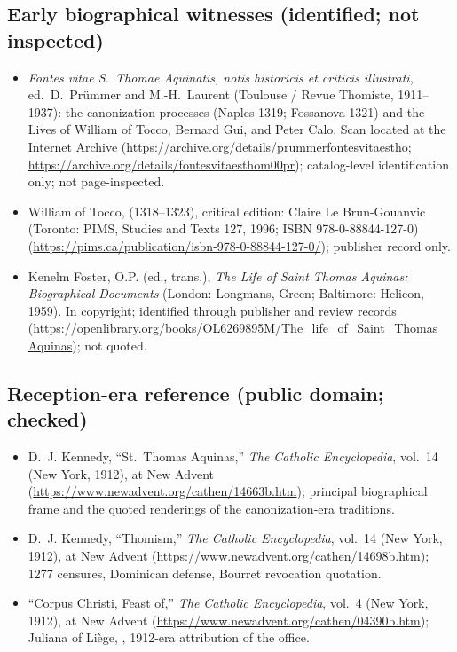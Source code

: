 \subsection*{Early biographical witnesses (identified; not inspected)}

\begin{itemize}
\item \textit{Fontes vitae S.\ Thomae Aquinatis, notis historicis et
criticis illustrati}, ed.\ D.~Pr\"ummer and M.-H.~Laurent (Toulouse /
Revue Thomiste, 1911--1937): the canonization processes (Naples 1319;
Fossanova 1321) and the Lives of William of Tocco, Bernard Gui, and
Peter Calo. Scan located at the Internet Archive
(\url{https://archive.org/details/prummerfontesvitaestho};
\url{https://archive.org/details/fontesvitaesthom00pr}); catalog-level
identification only; not page-inspected.
\item William of Tocco, 
(1318--1323), critical edition: Claire Le Brun-Gouanvic (Toronto: PIMS,
Studies and Texts 127, 1996; ISBN 978-0-88844-127-0)
(\url{https://pims.ca/publication/isbn-978-0-88844-127-0/}); publisher
record only.
\item Kenelm Foster, O.P. (ed., trans.), \textit{The Life of Saint
Thomas Aquinas: Biographical Documents} (London: Longmans, Green;
Baltimore: Helicon, 1959). In copyright; identified through publisher
and review records
(\url{https://openlibrary.org/books/OL6269895M/The_life_of_Saint_Thomas_Aquinas});
not quoted.
\end{itemize}

\subsection*{Reception-era reference (public domain; checked)}

\begin{itemize}
\item D.~J. Kennedy, ``St.\ Thomas Aquinas,'' \textit{The Catholic
Encyclopedia}, vol.~14 (New York, 1912), at New Advent
(\url{https://www.newadvent.org/cathen/14663b.htm}); principal
biographical frame and the quoted renderings of the canonization-era
traditions.
\item D.~J. Kennedy, ``Thomism,'' \textit{The Catholic Encyclopedia},
vol.~14 (New York, 1912), at New Advent
(\url{https://www.newadvent.org/cathen/14698b.htm}); 1277 censures,
Dominican defense, Bourret revocation quotation.
\item ``Corpus Christi, Feast of,'' \textit{The Catholic Encyclopedia},
vol.~4 (New York, 1912), at New Advent
(\url{https://www.newadvent.org/cathen/04390b.htm}); Juliana of Li\`ege,
, 1912-era attribution of the office.
\end{itemize}

